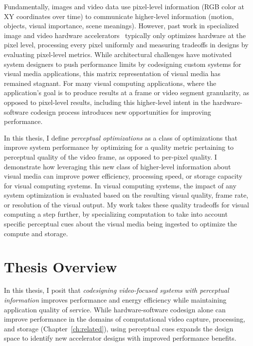 Fundamentally, images and video data use pixel-level information (RGB color at XY coordinates over time) to communicate higher-level information (motion, objects, visual importance, scene meanings).
However, past work in specialized image and video hardware accelerators~\cite{hauswald2014hybrid, convolution_engine, adams2010frankencamera} typically only optimizes hardware at the pixel level, processing every pixel uniformly and measuring tradeoffs in designs by evaluating pixel-level metrics.
While architectural challenges have motivated system designers to push performance limits by codesigning custom systems for visual media applications, this matrix representation of visual media has remained stagnant.
For many visual computing applications, where the application's goal is to produce results at a frame or video segment granularity, as opposed to pixel-level results, including this higher-level intent in the hardware-software codesign process introduces new opportunities for improving performance.

In this thesis, I define \textit{perceptual optimizations} as a class of optimizations that improve system performance by optimizing for a quality metric pertaining to perceptual quality of the video frame, as opposed to per-pixel quality.
I demonstrate how leveraging this new class of higher-level information about visual media can improve power efficiency, processing speed, or storage capacity for visual computing systems.
In visual computing systems, the impact of any system optimization is evaluated based on the resulting visual quality, frame rate, or resolution of the visual output.
My work takes these quality tradeoffs for visual computing a step further, by specializing computation to take into account specific perceptual cues about the visual media being ingested to optimize the compute and storage.

\section{Thesis Overview}
In this thesis, I posit that \emph{codesigning video-focused systems with perceptual information} improves performance and energy efficiency while maintaining application quality of service.
While hardware-software codesign alone can improve performance in the domains of computational video capture, processing, and storage (Chapter~\ref{ch:related}), using perceptual cues expands the design space to identify new accelerator designs with improved performance benefits.

